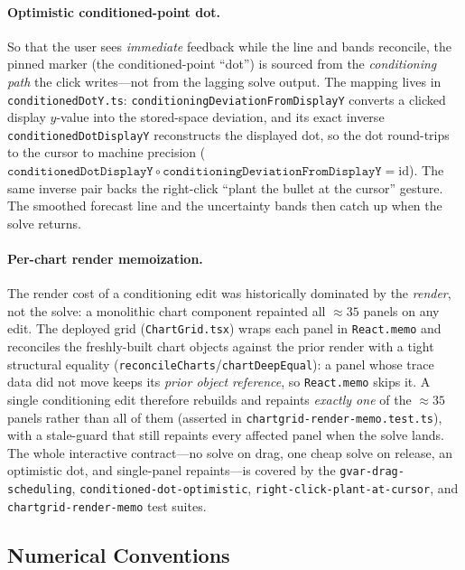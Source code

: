 \documentclass[11pt]{article}
\theoremstyle{definition}
\theoremstyle{remark}
\begin{document}
\paragraph{Optimistic conditioned-point dot.} So that the user sees
\emph{immediate} feedback while the line and bands reconcile, the pinned
marker (the conditioned-point ``dot'') is sourced from the
\emph{conditioning path} the click writes---not from the lagging solve
output. The mapping lives in \texttt{conditionedDotY.ts}:
\texttt{conditioningDeviationFromDisplayY} converts a clicked display
$y$-value into the stored-space deviation, and its exact inverse
\texttt{conditionedDotDisplayY} reconstructs the displayed dot, so the dot
round-trips to the cursor to machine precision
($\texttt{conditionedDotDisplayY}\circ\texttt{conditioningDeviationFromDisplayY}=\mathrm{id}$).
The same inverse pair backs the right-click ``plant the bullet at the
cursor'' gesture. The smoothed forecast line and the uncertainty bands
then catch up when the solve returns.

\paragraph{Per-chart render memoization.} The render cost of a
conditioning edit was historically dominated by the \emph{render}, not the
solve: a monolithic chart component repainted all $\approx 35$ panels on
any edit. The deployed grid (\texttt{ChartGrid.tsx}) wraps each panel in
\texttt{React.memo} and reconciles the freshly-built chart objects against
the prior render with a tight structural equality
(\texttt{reconcileCharts}/\texttt{chartDeepEqual}): a panel whose trace
data did not move keeps its \emph{prior object reference}, so
\texttt{React.memo} skips it. A single conditioning edit therefore
rebuilds and repaints \emph{exactly one} of the $\approx 35$ panels rather
than all of them (asserted in \texttt{chartgrid-render-memo.test.ts}), with
a stale-guard that still repaints every affected panel when the solve
lands. The whole interactive contract---no solve on drag, one cheap solve
on release, an optimistic dot, and single-panel repaints---is covered by
the \texttt{gvar-drag-scheduling}, \texttt{conditioned-dot-optimistic},
\texttt{right-click-plant-at-cursor}, and \texttt{chartgrid-render-memo}
test suites.

\subsection{Numerical Conventions}
\end{document}
